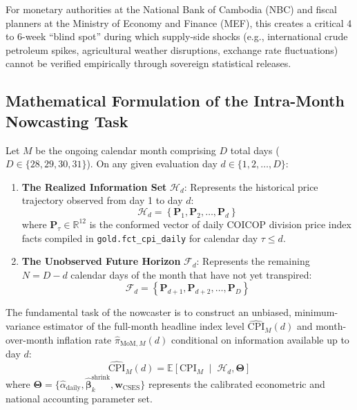 \documentclass[a4paper, 11pt]{article}
\begin{document}
For monetary authorities at the National Bank of Cambodia (NBC) and fiscal planners at the Ministry of Economy and Finance (MEF), this creates a critical 4 to 6-week ``blind spot'' during which supply-side shocks (e.g., international crude petroleum spikes, agricultural weather disruptions, exchange rate fluctuations) cannot be verified empirically through sovereign statistical releases.

\subsection{Mathematical Formulation of the Intra-Month Nowcasting Task}
Let $M$ be the ongoing calendar month comprising $D$ total days ($D \in \{28, 29, 30, 31\}$). On any given evaluation day $d \in \{1, 2, \dots, D\}$:
\begin{enumerate}
    \item \textbf{The Realized Information Set} $\mathcal{H}_d$: Represents the historical price trajectory observed from day 1 to day $d$:
    \begin{equation}
        \mathcal{H}_d = \left\{ \mathbf{P}_1, \mathbf{P}_2, \dots, \mathbf{P}_d \right\}
    \end{equation}
    where $\mathbf{P}_\tau \in \mathbb{R}^{12}$ is the conformed vector of daily COICOP division price index facts compiled in \texttt{gold.fct\_cpi\_daily} for calendar day $\tau \le d$.
    \item \textbf{The Unobserved Future Horizon} $\mathcal{F}_d$: Represents the remaining $N = D - d$ calendar days of the month that have not yet transpired:
    \begin{equation}
        \mathcal{F}_d = \left\{ \mathbf{P}_{d+1}, \mathbf{P}_{d+2}, \dots, \mathbf{P}_D \right\}
    \end{equation}
\end{enumerate}

\noindent The fundamental task of the nowcaster is to construct an unbiased, minimum-variance estimator of the full-month headline index level $\widehat{\text{CPI}}_M(d)$ and month-over-month inflation rate $\widehat{\pi}_{\text{MoM}, M}(d)$ conditional on information available up to day $d$:
\begin{equation}
    \widehat{\text{CPI}}_M(d) = \mathbb{E}\left[ \text{CPI}_M \;\middle|\; \mathcal{H}_d, \boldsymbol{\Theta} \right]
\end{equation}
where $\boldsymbol{\Theta} = \{\hat{\alpha}_{\text{daily}}, \hat{\boldsymbol{\beta}}_k^{\text{shrink}}, \mathbf{w}_{\text{CSES}}\}$ represents the calibrated econometric and national accounting parameter set.
\end{document}
